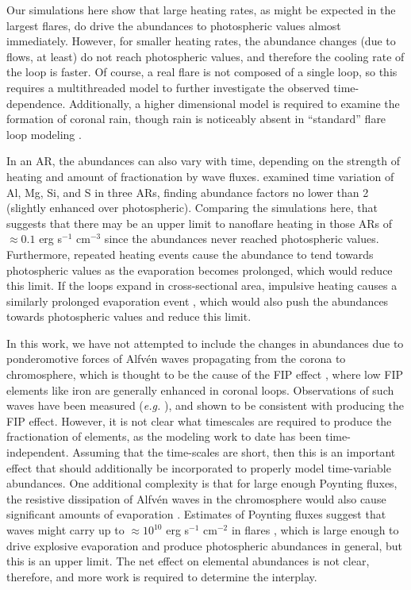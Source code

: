 \documentclass[twocolumn]{aastex631}
\begin{document}
Our simulations here show that large heating rates, as might be expected in the largest flares, do drive the abundances to photospheric values almost immediately.  However, for smaller heating rates, the abundance changes (due to flows, at least) do not reach photospheric values, and therefore the cooling rate of the loop is faster.  Of course, a real flare is not composed of a single loop, so this requires a multithreaded model to further investigate the observed time-dependence.  Additionally, a higher dimensional model is required to examine the formation of coronal rain, though rain is noticeably absent in ``standard'' flare loop modeling \citep{reep2020b}.  

In an AR, the abundances can also vary with time, depending on the strength of heating and amount of fractionation by wave fluxes.  \citet{mondal2023} examined time variation of Al, Mg, Si, and S in three ARs, finding abundance factors no lower than 2 (slightly enhanced over photospheric).  Comparing the simulations here, that suggests that there may be an upper limit to nanoflare heating in those ARs of $\approx 0.1$ erg s$^{-1}$ cm$^{-3}$ since the abundances never reached photospheric values.  Furthermore, repeated heating events cause the abundance to tend towards photospheric values as the evaporation becomes prolonged, which would reduce this limit.  If the loops expand in cross-sectional area, impulsive heating causes a similarly prolonged evaporation event \citep{reep2024}, which would also push the abundances towards photospheric values and reduce this limit.

In this work, we have not attempted to include the changes in abundances due to ponderomotive forces of Alfv\'en waves propagating from the corona to chromosphere, which is thought to be the cause of the FIP effect \citep{laming2015}, where low FIP elements like iron are generally enhanced in coronal loops.  Observations of such waves have been measured (\textit{e.g.} \citealt{murabito2024}), and shown to be consistent with producing the FIP effect.  However, it is not clear what timescales are required to produce the fractionation of elements, as the modeling work to date has been time-independent.  Assuming that the time-scales are short, then this is an important effect that should additionally be incorporated to properly model time-variable abundances.  One additional complexity is that for large enough Poynting fluxes, the resistive dissipation of Alfv\'en waves in the chromosphere would also cause significant amounts of evaporation \citep{reep2016}.  Estimates of Poynting fluxes suggest that waves might carry up to $\approx 10^{10}$ erg s$^{-1}$ cm$^{-2}$ in flares \citep{russell2023}, which is large enough to drive explosive evaporation and produce photospheric abundances in general, but this is an upper limit.   The net effect on elemental abundances is not clear, therefore, and more work is required to determine the interplay.  
\end{document}
